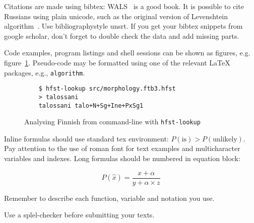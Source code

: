 \documentclass[11pt,a4paper,notitlepage]{article}
\newif\ifcameraready
\begin{document}
Citations are made using bibtex: WALS~\cite{haspelmath2005world} is a good book.
It is possible to cite Russians using plain unicode, such as the original
version of Levenshtein algorithm~\cite{levenshtein1965}.
Use bibliographystyle unsrt. If you get your bibtex snippets from google
scholar, don't forget to double check the data and add missing parts.

Code examples, program listings and shell sessions can be shown as figures,
e.g. figure~\ref{code:analysis}.
Pseudo-code may be formatted using one of the relevant \LaTeX{} packages, e.g.,
\texttt{algorithm}.

\begin{figure}
    \center
    \begin{verbatim}
    $ hfst-lookup src/morphology.ftb3.hfst
    > talossani
    talossani talo+N+Sg+Ine+PxSg1
    \end{verbatim}
    \caption{Analysing Finnish from command-line with \texttt{hfst-lookup}
    \label{code:analysis}}
\end{figure}

Inline formulas should use standard tex environment: $P(\mathrm{is}) >
P(\mathrm{unlikely})$. Pay attention to the use of roman font for text examples
and multicharacter variables and indexes. Long formulas should be numbered in
equation block:

\begin{equation}
    P(\hat x) = \frac{x+\alpha}{y+\alpha\times z}
\end{equation}

Remember to describe each function, variable and notation you use.

Use a splel-checker before submitting your texts.

\ifcameraready
\section*{Acknowledgments}

Acknowledgments should be un-numbered last section. Do not include
acknowledgements in anonymised review version.
\fi



\end{document}
